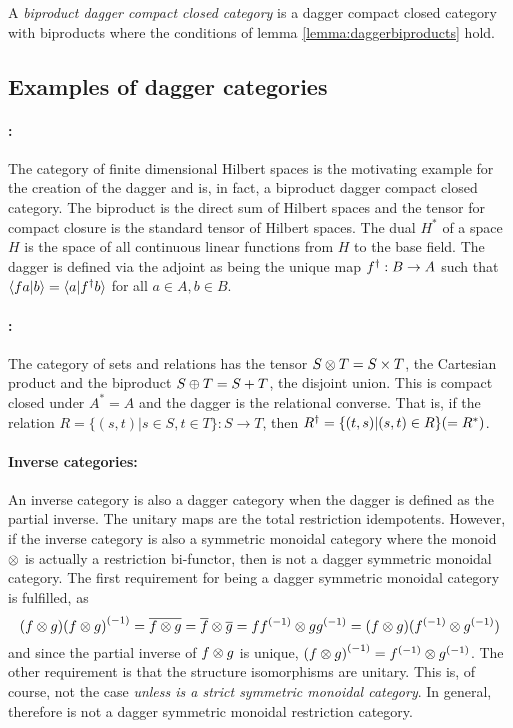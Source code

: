 \begin{definition} \label{def:biproductdaggerccc}
  A \emph{biproduct dagger compact closed category} is a dagger compact closed category with
  biproducts where the conditions of lemma \ref{lemma:daggerbiproducts} hold.
\end{definition}
\subsection{Examples of dagger categories}

\paragraph{\fdh{}:} The category of finite dimensional Hilbert spaces is the motivating example for
the creation of the dagger and is, in fact, a biproduct dagger compact closed category. The
biproduct is the direct sum of Hilbert spaces and the tensor for compact closure is the standard
tensor of Hilbert spaces. The dual $H^{*}$ of a space $H$ is the space of all continuous linear
functions from $H$ to the base field. The dagger is defined via the adjoint as being the unique map
${f}^{\dagger}:B\to A$ such that $\langle f a|b\rangle = \langle a | {f}^{\dagger} b\rangle$ for all $a\in A, b\in B$.

\paragraph{\rel{}:} The category \rel of sets and relations has the tensor $S\otimes T = S\times T$, the
Cartesian product and the biproduct $S\oplus T = S+T$, the disjoint union. This is compact closed under
$A^{*} = A$ and the dagger is the relational converse. That is, if the relation $R=\{(s,t)|s\in S,
t\in T\}:S\to T$, then ${R}^{\dagger}=\{(t,s)|(s,t)\in R\}(=R^{*})$.

\paragraph{Inverse categories:}
An inverse category \X is also a dagger category when the dagger is defined as the partial inverse.
The unitary maps are the total restriction idempotents. However, if the inverse category \X is also a
symmetric monoidal category where the monoid $\otimes$ is actually a restriction bi-functor, then \X is
not a dagger symmetric monoidal category. The first requirement for being a dagger symmetric
monoidal category is fulfilled, as
\[
  (f\otimes g) {(f\otimes g)}^{(-1)} = \overline{f\otimes g}=\overline{f} \otimes\overline{g} =
   f{f}^{(-1)} \otimes g {g}^{(-1)} = (f\otimes g) ({f}^{(-1)} \otimes {g}^{(-1)})
\]
and since the partial inverse of $f\otimes g$ is unique, ${(f\otimes g)}^{(-1)} = {f}^{(-1)} \otimes {g}^{(-1)}$. The other
requirement is that the structure isomorphisms are unitary. This is, of course, not the case
\emph{unless \X is a strict symmetric monoidal category}. In general,
therefore \X is not a dagger symmetric monoidal restriction category.

